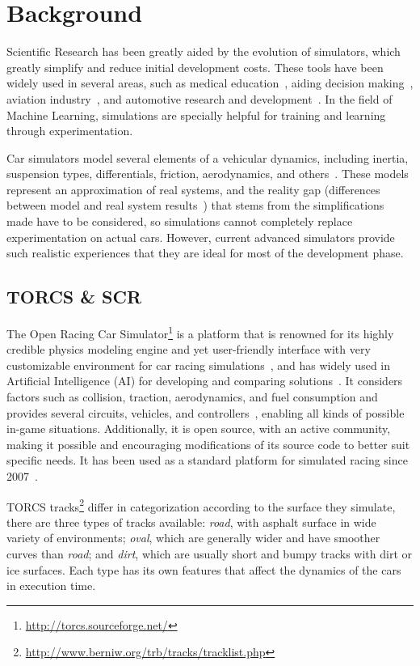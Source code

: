 \section{Background}\label{sec:2}

Scientific Research has been greatly aided by the evolution of simulators, which greatly simplify and reduce initial development costs. These tools have been widely used in several areas, such as medical education~\cite{MEDIC}, aiding decision making~\cite{useOfSimulaton2002}, aviation industry~\cite{AIR}, and automotive research and development~\cite{AUTR}. In the field of Machine Learning, simulations are specially helpful for training and learning through experimentation.

Car simulators model several elements of a vehicular dynamics, including inertia, suspension types, differentials, friction, aerodynamics, and others~\cite{SIMUTORCS}. These models represent an approximation of real systems, and the reality gap (differences between model and real system results~\cite{brookes2012authentic}) that stems from the simplifications made have to be considered, so simulations cannot completely replace experimentation on actual cars. However, current advanced simulators provide such realistic experiences that they are ideal for most of the development phase.

\subsection{TORCS \& SCR}
The Open Racing Car Simulator\footnote{\url{http://torcs.sourceforge.net/}} is a platform that is renowned for its highly credible physics modeling engine and yet user-friendly interface with very customizable environment for car racing simulations~\cite{SIMUTORCS,SCR}, and has widely used in Artificial Intelligence (AI) for developing and comparing solutions~\cite{2009}. It considers factors such as collision, traction, aerodynamics, and fuel consumption and provides several circuits, vehicles, and controllers~\cite{2009,Loiacono:2012:LEA:2212908.2212953}, enabling all kinds of possible in-game situations. Additionally, it is open source, with an active community, making it possible and encouraging modifications of its source code to better suit specific needs. It has been used as a standard platform for simulated racing since 2007~\cite{Loiacono:2012:LEA:2212908.2212953}.

\newcommand{\track}[1]{\emph{#1}}%
TORCS tracks\footnote{\url{http://www.berniw.org/trb/tracks/tracklist.php}} differ in categorization according to the surface they simulate, there are three types of tracks available: \track{road}, with asphalt surface in wide variety of environments; \track{oval}, which are generally wider and have smoother curves than \track{road}; and \track{dirt}, which are usually short and bumpy tracks with dirt or ice surfaces. Each type has its own features that affect the dynamics of the cars in execution time.


